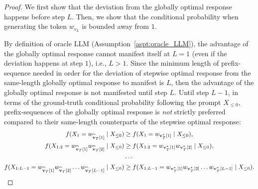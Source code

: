 \begin{proof}
    We first show that the deviation from the globally optimal response happens before step $L$.
    Then, we show that the conditional probability when generating the token $w_{v_L}$ is bounded away from $1$.

    By definition of oracle LLM (Assumption~\ref{aspt:oracle_LLM}), the advantage of the globally optimal response cannot manifest itself at $L = 1$ (even if the deviation happens at step $1$), i.e., $L > 1$.
    Since the minimum length of prefix-sequence needed in order for the deviation of stepwise optimal response from the same-length globally optimal response to manifest is $L$, then the advantage of the globally optimal response is not manifested until step $L$.
    Until step $L - 1$, in terms of the ground-truth conditional probability following the prompt $X_{\leq 0}$, prefix-sequences of the globally optimal response is \emph{not} strictly preferred compared to their same-length counterparts of the stepwise optimal response:
    \begin{equation}\label{equ:before_manifest}
        \small
        \begin{split}
            f(X_1 = w_{\widehat{\mathbf{v}}_T[1]} \mid X_{\leq 0})                             & \geq f(X_1 = w_{\mathbf{v}_T^*[1]} \mid X_{\leq 0}),                                                  \\
            f(X_{1:2} = w_{\widehat{\mathbf{v}}_T[1]} w_{\widehat{\mathbf{v}}_T[2]} \mid X_{\leq 0}) & \geq f(X_{1:2} = w_{\mathbf{v}_T^*[1]} w_{\mathbf{v}_T^*[2]} \mid X_{\leq 0}),                              \\
                                                                                         & \cdots                                                                                          \\
            f(X_{1:L-1} = w_{\widehat{\mathbf{v}}_T[1]} w_{\widehat{\mathbf{v}}_T[2]} \ldots w_{\widehat{\mathbf{v}}_T[L - 1]} \mid X_{\leq 0})
                                                                                         & \geq f(X_{1:L-1} = w_{\mathbf{v}_T^*[1]} w_{\mathbf{v}_T^*[2]} \ldots w_{\mathbf{v}_T^*[L - 1]} \mid X_{\leq 0}).
        \end{split}
    \end{equation}


\end{proof}
